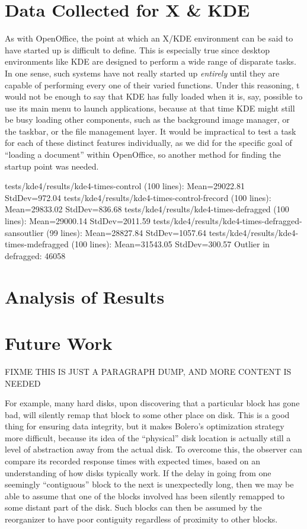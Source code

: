 \documentclass[10pt,twocolumn,letterpaper]{article}
\begin{document}
\section{Data Collected for X \& KDE}

As with OpenOffice, the point at which an X/KDE environment can be said to have started up is difficult to define. This is especially true  since desktop environments like KDE are designed
to perform a wide range of disparate tasks. In one sense, such systems have not really started up \emph{entirely} until they are capable of performing every one of their varied functions. Under this reasoning, t would not be enough to say that KDE has fully loaded when it is, say, possible to use its main menu to launch applications, because at that time KDE might still be busy loading other components, such as the background image manager, or the taskbar, or
the file management layer. It would be impractical to test a task for each of these distinct features individually,
as we did for the specific goal of ``loading a document'' within OpenOffice, so another method for finding the startup point was needed.

tests/kde4/results/kde4-times-control (100 lines):  Mean=29022.81  StdDev=972.04
tests/kde4/results/kde4-times-control-frecord (100 lines):  Mean=29833.02  StdDev=836.68
tests/kde4/results/kde4-times-defragged (100 lines):  Mean=29000.14  StdDev=2011.59
tests/kde4/results/kde4-times-defragged-sansoutlier (99 lines):  Mean=28827.84  StdDev=1057.64
tests/kde4/results/kde4-times-mdefragged (100 lines):  Mean=31543.05  StdDev=300.57
Outlier in defragged: 46058

\section{Analysis of Results}

\section{Future Work}\label{sec:future}

FIXME THIS IS JUST A PARAGRAPH DUMP, AND MORE CONTENT IS NEEDED

For example, many hard disks, upon discovering that a particular block has gone bad, will silently
remap that block to some other place on disk\cite{remapping}. This is a good thing for ensuring
data integrity, but it makes Bolero's optimization strategy more difficult, because
its idea of the ``physical'' disk location is actually still a level of abstraction away from
the actual disk. To overcome this, the observer can compare its recorded response
times with expected times, based on an understanding of how disks typically work.
If the delay in going from one seemingly ``contiguous'' block to the next
is unexpectedly long, then we may be able to assume that one of the blocks involved
has been silently remapped to some distant part of the disk. Such blocks can then be
assumed by the reorganizer to have poor contiguity regardless of proximity to other
blocks.
\end{document}
